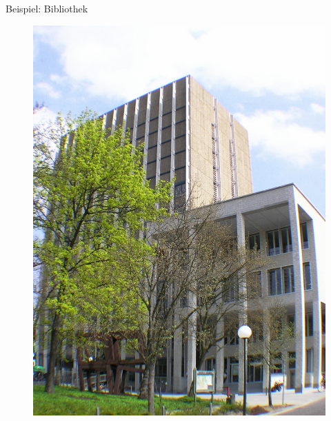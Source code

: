 \documentclass[18pt]{beamer}
\begin{document}
\begin{frame}{Beispiel: Bibliothek}
    \begin{figure}
        \includegraphics[scale=0.15]{img/kit_bib_sued.jpg}
    \end{figure}
\end{frame}
\end{document}
